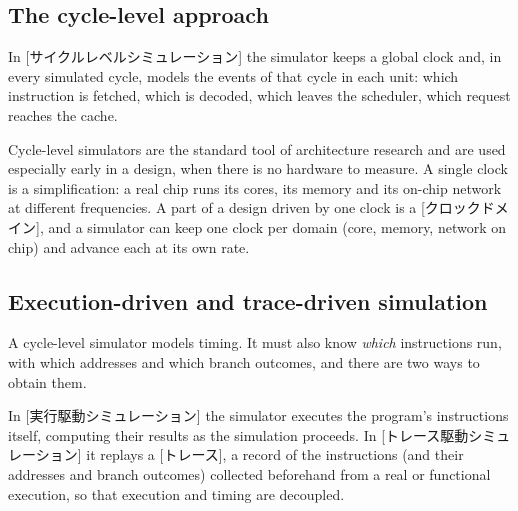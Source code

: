 \documentclass[../main.tex]{subfiles}
\begin{document}
\subsection{The cycle-level approach}

\begin{definition}
  \label{def:l08-cycle-level}
  In [サイクルレベルシミュレーション] the
  simulator keeps a global clock and, in every simulated cycle, models
  the events of that cycle in each unit: which instruction is fetched,
  which is decoded, which leaves the scheduler, which request reaches
  the cache.
\end{definition}

Cycle-level simulators are the standard tool of architecture research
and are used especially early in a design, when there is no hardware
to measure.  A single clock is a simplification: a real chip runs its
cores, its memory and its on-chip network at different frequencies.
A part of a design driven by one clock is a
[クロックドメイン], and a simulator can keep one
clock per domain (core, memory, network on chip) and advance each at
its own rate.

\subsection{Execution-driven and trace-driven simulation}

A cycle-level simulator models timing.  It must also know
\emph{which} instructions run, with which addresses and which branch
outcomes, and there are two ways to obtain them.

\begin{definition}
  \label{def:l08-exec-trace}
  In [実行駆動シミュレーション] the
  simulator executes the program's instructions itself, computing
  their results as the simulation proceeds.  In
  [トレース駆動シミュレーション] it
  replays a [トレース], a record of the instructions (and
  their addresses and branch outcomes) collected beforehand from a real
  or functional execution, so that execution and timing are decoupled.
\end{definition}
\end{document}
